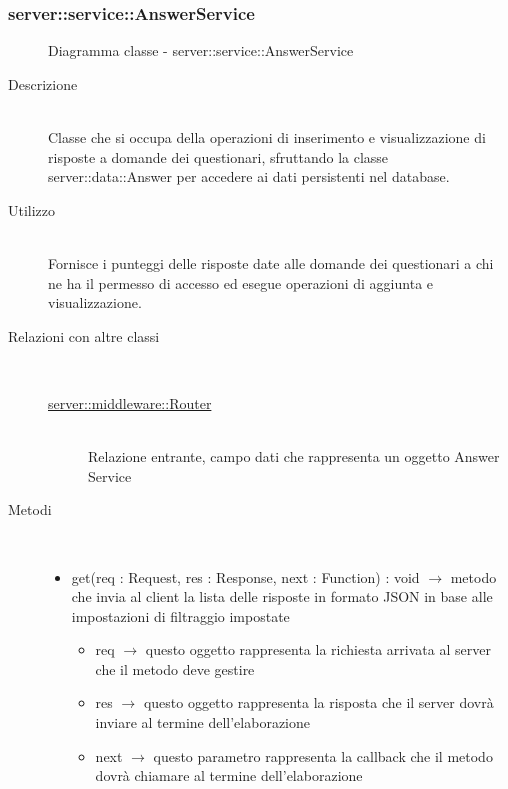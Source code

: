 \subsubsection[AnswerService]{server::service::AnswerService}
\begin{figure}[H]
	\centering
	\caption{Diagramma classe - server::service::AnswerService}
\end{figure}\begin{description}
\item[Descrizione] \hfill \\
Classe che si occupa della operazioni di inserimento e visualizzazione di risposte a domande dei questionari, sfruttando la classe server::data::Answer per accedere ai dati persistenti nel database.
\item[Utilizzo] \hfill \\
Fornisce i punteggi delle risposte date alle domande dei questionari a chi ne ha il permesso di accesso ed esegue operazioni di aggiunta e visualizzazione.
\item[Relazioni con altre classi] \hfill \\
\vspace{-7mm}
\begin{description}
	\item[\hyperlink{server::middleware::Router}{server::middleware::Router}] \hfill \\
	Relazione entrante, campo dati che rappresenta un oggetto Answer Service
\end{description}

\item[Metodi] \hfill \\
\vspace{-7mm}
\begin{itemize}
	\item get(req : Request, res : Response, next : Function) : void $\rightarrow$ metodo che invia al client la lista delle risposte in formato JSON in base alle impostazioni di filtraggio impostate\begin{itemize}
		\item req $\rightarrow$ questo oggetto rappresenta la richiesta arrivata al server che il metodo deve gestire
		\item res $\rightarrow$ questo oggetto rappresenta la risposta che il server dovrà inviare al termine dell'elaborazione
		\item next $\rightarrow$ questo parametro rappresenta la callback che il metodo dovrà chiamare al termine dell’elaborazione
	\end{itemize}
	

\end{itemize}
\end{description}
